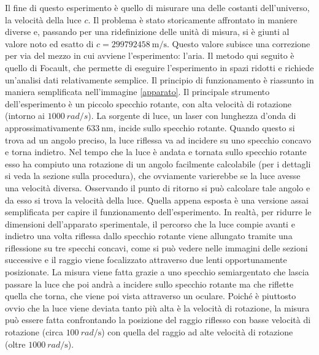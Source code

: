 \documentclass[a4paper,11pt]{article}
\begin{document}
	Il fine di questo esperimento è quello di misurare una delle costanti dell'universo, la velocità della luce $c$. Il problema è stato storicamente affrontato in maniere diverse e, passando per una ridefinizione delle unità di misura, si è giunti al valore noto ed esatto di $c = \SI{299792458}{\meter / \second}$. Questo valore subisce una correzione per via del mezzo in cui avviene l'esperimento: l'aria.
	Il metodo qui seguito è quello di Focault, che permette di eseguire l'esperimento in spazi ridotti e richiede un'analisi dati relativamente semplice. Il principio di funzionamento è riassunto in maniera semplificata nell'immagine \ref{apparato}. Il principale strumento dell'esperimento è un piccolo specchio rotante, con alta velocità di rotazione (intorno ai $\SI{1000}{rad / s}$). La sorgente di luce, un laser con lunghezza d'onda di approssimativamente $\SI{633}{\nano \meter}$, incide sullo specchio rotante. Quando questo si trova ad un angolo preciso, la luce riflessa va ad incidere su uno specchio concavo e torna indietro. Nel tempo che la luce è andata e tornata sullo specchio rotante esso ha compiuto una rotazione di un angolo facilmente calcolabile (per i dettagli si veda la sezione sulla procedura), che ovviamente varierebbe se la luce avesse una velocità diversa. Osservando il punto di ritorno si può calcolare tale angolo e da esso si trova la velocità della luce.
	Quella appena esposta è una versione assai semplificata per capire il funzionamento dell'esperimento. In realtà, per ridurre le dimensioni dell'apparato sperimentale, il percorso che la luce compie avanti e indietro una volta riflessa dallo specchio rotante viene allungato tramite una riflessione su tre specchi concavi, come si può vedere nelle immagini delle sezioni successive e il raggio viene focalizzato attraverso due lenti opportunamente posizionate. La misura viene fatta grazie a uno specchio semiargentato che lascia passare la luce che poi andrà a incidere sullo specchio rotante ma che riflette quella che torna, che viene poi vista attraverso un oculare. Poiché è piuttosto ovvio che la luce viene deviata tanto più alta è la velocità di rotazione, la misura può essere fatta confrontando la posizione del raggio riflesso con basse velocità di rotazione (circa $\SI{100}{rad / \second}$) con quella del raggio ad alte velocità di rotazione (oltre $\SI{1000}{rad / \second}$).
	
\end{document}

